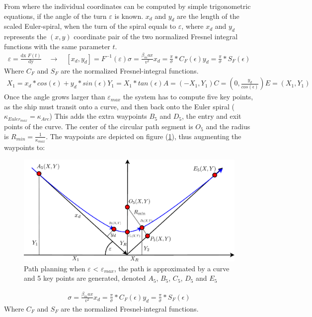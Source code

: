 From where the individual coordinates can be computed by simple trigonometric equations, if the angle of the turn $\varepsilon$ is known. $x_d$ and $y_d$ are the length of the scaled Euler-spiral, when the turn of the spiral equals to $\varepsilon$, where $x_d$ and $y_d$ represents the $(x,y)$ coordinate pair of the two normalized Fresnel integral functions with the same parameter $t$. 
\begin{align}
\varepsilon = \frac{\textrm{dx }F(t)}{\textrm{dy}} \quad \to \quad [x_d,y_d] = F^{-1}(\varepsilon)
\sigma = \frac{\beta_max}{v^2} 
x_d = \frac{\pi}{\sigma} * C_F(\epsilon)
y_d = \frac{\pi}{\sigma} * S_F(\epsilon)
\end{align}
Where $C_F$ and $S_F$ are the normalized Fresnel-integral functions.
\begin{align}
X_1 = x_d * cos(\epsilon) + y_d * sin(\epsilon)
Y_1 = X_1 * tan(\epsilon)
A = (-X_1, Y_1)
C = (0, \frac{y_d}{cos(\epsilon)})
E = (X_1, Y_1)
\end{align}
Once the angle grows larger than $\varepsilon_{max}$ the system has to compute five key points, as the ship must transit onto a curve, and then back onto the Euler spiral ($\kappa_{Euler_{max}} = \kappa_{Arc}$) This adds the extra waypoints $B_5$ and $D_5$, the entry and exit points of the curve. The center of the circular path segment is $O_5$ and the radius is $R_{min} = \frac{1}{\kappa_{max}}$. The waypoints are depicted on figure (\ref{fig:5points}), thus augmenting the waypoints to:
\begin{figure}
	\begin{center}
		\includegraphics[width=\textwidth]{img/LocalPlannerFigures/5Points.pdf}    %
		\caption{Path planning when $\varepsilon$ < $\varepsilon_{max}$, the path is approximated by a curve and 5 key points are generated, denoted $A_5$, $B_5$, $C_5$, $D_5$ and $E_5$}  %
		\label{fig:5points}               
	\end{center}                            
\end{figure}
\begin{align}
 \sigma = \frac{\beta_max}{v^2} 
x_d = \frac{\pi}{\sigma} * C_F(\epsilon)
y_d = \frac{\pi}{\sigma} * S_F(\epsilon)
\end{align}
Where $C_F$ and $S_F$ are the normalized Fresnel-integral functions.

